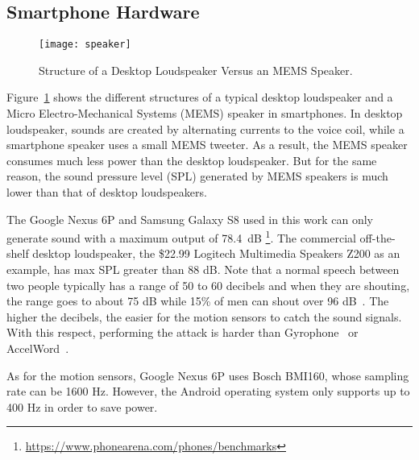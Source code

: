 \subsection{Smartphone Hardware}


\begin{figure}[!h]
	\centering
	\hspace{.25in}
	\texttt{[image: speaker]}
	\caption{Structure of a Desktop Loudspeaker Versus an MEMS Speaker.}
	\label{fig:speaker}
\end{figure}

Figure~\ref{fig:speaker} shows the different structures of a typical desktop loudspeaker and a Micro Electro-Mechanical Systems (MEMS) speaker in smartphones. In desktop loudspeaker, sounds are created by alternating currents to the voice coil, while a smartphone speaker uses a small MEMS tweeter. As a result, the MEMS speaker consumes much less power than the desktop loudspeaker. But for the same reason, the sound pressure level (SPL) generated by MEMS speakers is much lower than that of desktop loudspeakers.



The Google Nexus 6P and Samsung Galaxy S8 used in this work can only generate sound with a maximum output of 78.4~dB
\footnote{\scriptsize \url{https://www.phonearena.com/phones/benchmarks}}. 
The commercial off-the-shelf desktop loudspeaker, the \$22.99 Logitech Multimedia Speakers Z200 as an example, has max SPL greater than 88 dB. 
%
Note that a normal speech between two people typically has a range of 50 to 60 decibels and when they are shouting, the range goes to about 75 dB while 15\% of men can shout over 96 dB~\cite{online2005Voice}.
%
The higher the decibels, the easier for the motion sensors to catch the sound signals. With this respect, performing the {\attackName} attack is harder than Gyrophone~\cite{michalevsky2014gyrophone} or AccelWord~\cite{zhang2015accelword}.

As for the motion sensors, Google Nexus 6P uses Bosch BMI160, whose sampling rate can be 1600 Hz. However, the Android operating system only supports up to 400 Hz in order to save power.





%

